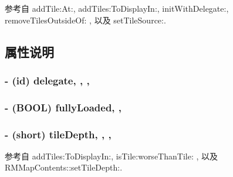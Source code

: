参考自 add\-Tile\-:\-At\-:, add\-Tiles\-:\-To\-Display\-In\-:, init\-With\-Delegate\-:, remove\-Tiles\-Outside\-Of\-: , 以及 set\-Tile\-Source\-:.



\subsection{属性说明}
\hypertarget{interface_r_m_tile_image_set_ae947fac72e535f6ba3288a1a3d0eddd3}{
\subsubsection[{delegate}]{\setlength{\rightskip}{0pt plus 5cm}-\/ (id) delegate\hspace{0.3cm}{\ttfamily [read]}, {\ttfamily [write]}, {\ttfamily [nonatomic]}, {\ttfamily [assign]}}}\label{interface_r_m_tile_image_set_ae947fac72e535f6ba3288a1a3d0eddd3}
\hypertarget{interface_r_m_tile_image_set_a9b5c09c58a3afb2dab367be213d88603}{
\subsubsection[{fully\-Loaded}]{\setlength{\rightskip}{0pt plus 5cm}-\/ (B\-O\-O\-L) fully\-Loaded\hspace{0.3cm}{\ttfamily [read]}, {\ttfamily [atomic]}, {\ttfamily [assign]}}}\label{interface_r_m_tile_image_set_a9b5c09c58a3afb2dab367be213d88603}
\hypertarget{interface_r_m_tile_image_set_aa0e24e61acf64b8014c293dcb6326204}{
\subsubsection[{tile\-Depth}]{\setlength{\rightskip}{0pt plus 5cm}-\/ (short) tile\-Depth\hspace{0.3cm}{\ttfamily [read]}, {\ttfamily [write]}, {\ttfamily [atomic]}, {\ttfamily [assign]}}}\label{interface_r_m_tile_image_set_aa0e24e61acf64b8014c293dcb6326204}


参考自 add\-Tiles\-:\-To\-Display\-In\-:, is\-Tile\-:worse\-Than\-Tile\-: , 以及 R\-M\-Map\-Contents\-::set\-Tile\-Depth\-:.

